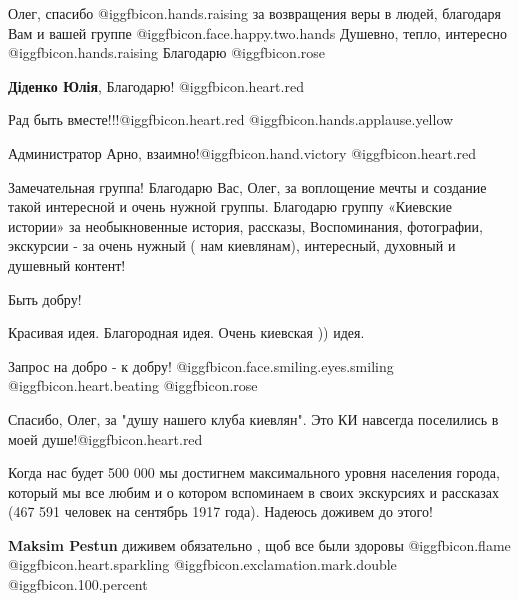 \begin{itemize}
Олег, спасибо  @igg{fbicon.hands.raising}  за возвращения веры в людей,
благодаря Вам и вашей группе  @igg{fbicon.face.happy.two.hands} Душевно, тепло,
интересно  @igg{fbicon.hands.raising}  Благодарю  @igg{fbicon.rose} 

\begin{itemize} %
\textbf{Діденко Юлія}, Благодарю! @igg{fbicon.heart.red}
\end{itemize} %

Рад быть вместе!!!@igg{fbicon.heart.red} @igg{fbicon.hands.applause.yellow} 

\begin{itemize} %
Администратор
Арно, взаимно!@igg{fbicon.hand.victory} @igg{fbicon.heart.red}
\end{itemize} %


Замечательная группа! Благодарю Вас, Олег, за воплощение мечты и создание такой
интересной и очень нужной группы. Благодарю группу «Киевские истории» за
необыкновенные история, рассказы, Воспоминания, фотографии, экскурсии - за
очень нужный ( нам киевлянам), интересный, духовный и душевный контент!

Быть добру!


Красивая идея. Благородная идея. Очень киевская )) идея.

Запрос на добро - к добру!  @igg{fbicon.face.smiling.eyes.smiling}  @igg{fbicon.heart.beating}  @igg{fbicon.rose} 

Спасибо, Олег, за "душу нашего клуба киевлян". Это КИ навсегда поселились в моей душе!@igg{fbicon.heart.red}


Когда нас будет 500 000 мы достигнем максимального уровня населения города,
который мы все любим и о котором вспоминаем в своих экскурсиях и рассказах (467
591 человек на сентябрь 1917 года). Надеюсь доживем до этого!

\begin{itemize} %
\textbf{Maksim Pestun} диживем обязательно , щоб все были здоровы  @igg{fbicon.flame}  @igg{fbicon.heart.sparkling} @igg{fbicon.exclamation.mark.double}  @igg{fbicon.100.percent} 
\end{itemize} %



\end{itemize}
